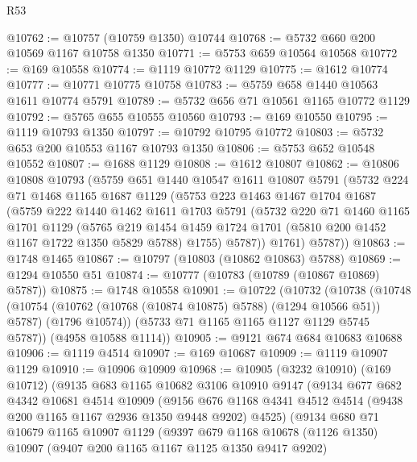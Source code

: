 \begin{lexlean}{R53}
\begin{coremodule}
@10762 := @10757 (@10759 @1350) @10744
@10768 := @5732 @660 @200 @10569 @1167 @10758 @1350
@10771 := @5753 @659 @10564 @10568
@10772 := @169 @10558
@10774 := @1119 @10772 @1129
@10775 := @1612 @10774
@10777 := @10771 @10775 @10758
@10783 := @5759 @658 @1440 @10563 @1611 @10774 @5791
@10789 := @5732 @656 @71 @10561 @1165 @10772 @1129
@10792 := @5765 @655 @10555 @10560
@10793 := @169 @10550
@10795 := @1119 @10793 @1350
@10797 := @10792 @10795 @10772
@10803 := @5732 @653 @200 @10553 @1167 @10793 @1350
@10806 := @5753 @652 @10548 @10552
@10807 := @1688 @1129
@10808 := @1612 @10807
@10862 := @10806
    @10808
    @10793
    (@5759
      @651
      @1440
      @10547
      @1611
      @10807
      @5791
      (@5732
        @224
        @71
        @1468
        @1165
        @1687
        @1129
        (@5753
          @223
          @1463
          @1467
          @1704
          @1687
          (@5759
            @222
            @1440
            @1462
            @1611
            @1703
            @5791
            (@5732
              @220
              @71
              @1460
              @1165
              @1701
              @1129
              (@5765
                @219
                @1454
                @1459
                @1724
                @1701
                (@5810 @200 @1452 @1167 @1722 @1350 @5829 @5788)
                @1755)
              @5787))
          @1761)
        @5787))
@10863 := @1748 @1465
@10867 := @10797 (@10803 (@10862 @10863) @5788)
@10869 := @1294 @10550 @51
@10874 := @10777 (@10783 (@10789 (@10867 @10869) @5787))
@10875 := @1748 @10558
@10901 := @10722
    (@10732
      (@10738
        (@10748
          (@10754 (@10762 (@10768 (@10874 @10875) @5788) (@1294 @10566 @51)) @5787)
          (@1796 @10574))
        (@5733 @71 @1165 @1165 @1127 @1129 @5745 @5787))
      (@4958 @10588 @1114))
@10905 := @9121 @674 @684 @10683 @10688
@10906 := @1119 @4514
@10907 := @169 @10687
@10909 := @1119 @10907 @1129
@10910 := @10906 @10909
@10968 := @10905
    (@3232 @10910)
    (@169 @10712)
    (@9135
      @683
      @1165
      @10682
      @3106
      @10910
      @9147
      (@9134
        @677
        @682
        @4342
        @10681
        @4514
        @10909
        (@9156 @676 @1168 @4341 @4512 @4514 (@9438 @200 @1165 @1167 @2936 @1350 @9448 @9202) @4525)
        (@9134
          @680
          @71
          @10679
          @1165
          @10907
          @1129
          (@9397
            @679
            @1168
            @10678
            (@1126 @1350)
            @10907
            (@9407 @200 @1165 @1167 @1125 @1350 @9417 @9202)

\end{coremodule}
\end{lexlean}
